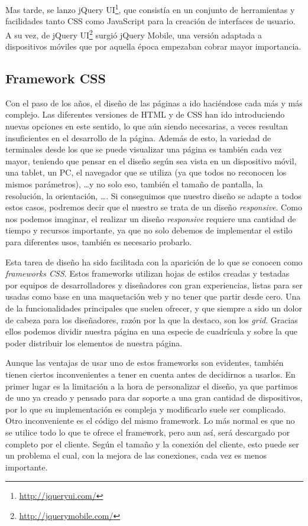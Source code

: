 Mas tarde, se lanzo jQuery UI\footnote{\url{http://jqueryui.com/}}, que consistía en un conjunto de herramientas y facilidades tanto CSS como JavaScript para la creación de interfaces de usuario. A su vez, de jQuery UI\footnote{\url{http://jquerymobile.com/}} surgió jQuery Mobile, una versión adaptada a dispositivos móviles que por aquella época empezaban cobrar mayor importancia.

\subsection{Framework CSS}

\cite{BootstrapFoundation,BestFramCSS} Con el paso de los años, el diseño de las páginas a ido haciéndose cada más y más complejo. Las diferentes versiones de \gls{HTML} y de \gls{CSS} han ido introduciendo nuevas opciones en este sentido, lo que aún siendo necesarias, a veces resultan insuficientes en el desarrollo de la página. Además de esto, la variedad de terminales desde los que se puede visualizar una página es también cada vez mayor, teniendo que pensar en el diseño según sea vista en un dispositivo móvil, una tablet, un PC, el navegador que se utiliza (ya que todos no reconocen los mismos parámetros), \ldots y no solo eso, también el tamaño de pantalla, la resolución, la orientación, \ldots. Si conseguimos que nuestro diseño se adapte a todos estos casos, podremos decir que el nuestro se trata de un diseño \emph{responsive}. Como nos podemos imaginar, el realizar un diseño \emph{responsive} requiere una cantidad de tiempo y recursos importante, ya que no solo debemos de implementar el estilo para diferentes usos, también es necesario probarlo.

Esta tarea de diseño ha sido facilitada con la aparición de lo que se conocen como \emph{frameworks \gls{CSS}}. Estos frameworks utilizan hojas de estilos creadas y testadas por equipos de desarrolladores y diseñadores con gran experiencias, listas para ser usadas como base en una maquetación web y no tener que partir desde cero. Una de la funcionalidades principales que suelen ofrecer, y que siempre a sido un dolor de cabeza para los diseñadores, razón por la que la destaco, son los \emph{grid}. Gracias ellos podemos dividir nuestra página en una especie de cuadrícula y sobre la que poder distribuir los elementos de nuestra página.

Aunque las ventajas de usar uno de estos frameworks son evidentes, también tienen ciertos inconvenientes a tener en cuenta antes de decidirnos a usarlos. En primer lugar es la limitación a la hora de personalizar el diseño, ya que partimos de uno ya creado y pensado para dar soporte a una gran cantidad de dispositivos, por lo que su implementación es compleja y modificarlo suele ser complicado. Otro inconveniente es el código del mismo framework. Lo más normal es que no se utilice todo lo que te ofrece el framework, pero aun así, será descargado por completo por el cliente. Según el tamaño y la conexión del cliente, esto puede ser un problema el cual, con la mejora de las conexiones, cada vez es menos importante.


